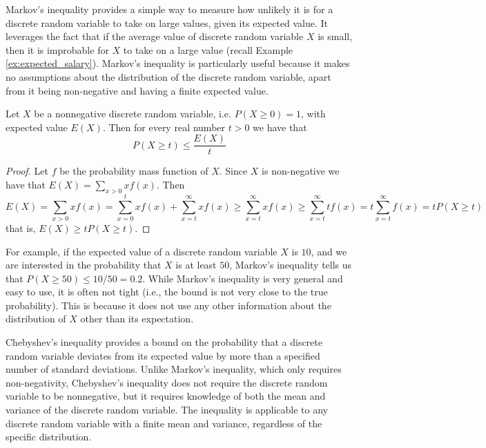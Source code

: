 Markov's inequality provides a simple way to measure how unlikely it is for a discrete random variable to take on large values, given its expected value. It leverages the fact that if the average value of discrete random variable $X$ is small, then it is improbable for $X$ to take on a large value (recall Example \ref{ex:expected_salary}). Markov's inequality is particularly useful because it makes no assumptions about the distribution of the discrete random variable, apart from it being non-negative and having a finite expected value.

\begin{proposition}
Let $X$ be a nonnegative discrete random variable, i.e. $P\left( X \geq 0 \right) = 1$, with expected value $E(X)$. Then for every real number $t>0$ we have that 
\[
P \left( X \geq t \right) \leq \frac{E(X)}{t}
\]
\end{proposition}
\begin{proof}
Let $f$ be the probability mass function of $X$. Since $X$ is non-negative we have that $E(X) = \sum_{x>0} x f \left( x \right)$. Then
\[
E(X) = \sum_{x>0} x f \left( x \right) = \sum_{x=0}^{t} x f \left( x \right) + \sum_{x=t}^{\infty} x f \left( x \right) \geq
\sum_{x=t}^{\infty} x f \left( x \right) \geq \sum_{x=t}^{\infty} t f \left( x \right) = t \sum_{x=t}^{\infty} f \left( x \right) =
t P \left( X \geq t \right)
\]
that is, $E(X) \geq t P \left( X \geq t \right)$.
\end{proof}

For example, if the expected value of a discrete random variable $X$ is $10$, and we are interested in the probability that $X$ is at least $50$, Markov's inequality tells us that $P(X \geq 50) \leq 10/50 = 0.2$. While Markov's inequality is very general and easy to use, it is often not tight (i.e., the bound is not very close to the true probability). This is because it does not use any other information about the distribution of $X$ other than its expectation.

Chebyshev's inequality provides a bound on the probability that a discrete random variable deviates from its expected value by more than a specified number of standard deviations. Unlike Markov's inequality, which only requires non-negativity, Chebyshev's inequality does not require the discrete random variable to be nonnegative, but it requires knowledge of both the mean and variance of the discrete random variable. The inequality is applicable to any discrete random variable with a finite mean and variance, regardless of the specific distribution.

